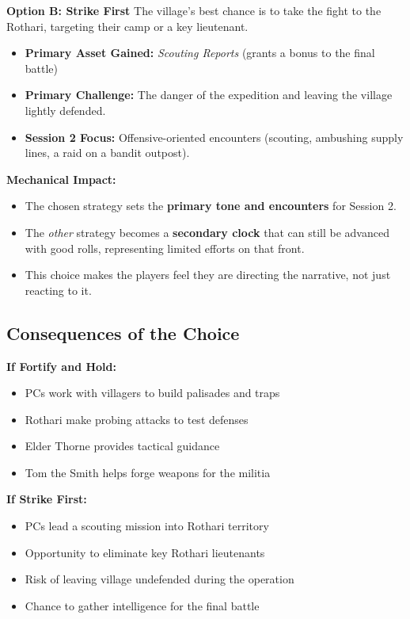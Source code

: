 \documentclass[11pt]{article}
\begin{document}
\textbf{Option B: Strike First}
The village's best chance is to take the fight to the Rothari, targeting their camp or a key lieutenant.
\begin{itemize}
\item \textbf{Primary Asset Gained:} \textit{Scouting Reports} (grants a bonus to the final battle)
\item \textbf{Primary Challenge:} The danger of the expedition and leaving the village lightly defended.
\item \textbf{Session 2 Focus:} Offensive-oriented encounters (scouting, ambushing supply lines, a raid on a bandit outpost).
\end{itemize}

\textbf{Mechanical Impact:}
\begin{itemize}
\item The chosen strategy sets the \textbf{primary tone and encounters} for Session 2.
\item The \textit{other} strategy becomes a \textbf{secondary clock} that can still be advanced with good rolls, representing limited efforts on that front.
\item This choice makes the players feel they are directing the narrative, not just reacting to it.
\end{itemize}

\subsection{Consequences of the Choice}

\textbf{If Fortify and Hold:}
\begin{itemize}
\item PCs work with villagers to build palisades and traps
\item Rothari make probing attacks to test defenses
\item Elder Thorne provides tactical guidance
\item Tom the Smith helps forge weapons for the militia
\end{itemize}

\textbf{If Strike First:}
\begin{itemize}
\item PCs lead a scouting mission into Rothari territory
\item Opportunity to eliminate key Rothari lieutenants
\item Risk of leaving village undefended during the operation
\item Chance to gather intelligence for the final battle
\end{itemize}
\end{document}
